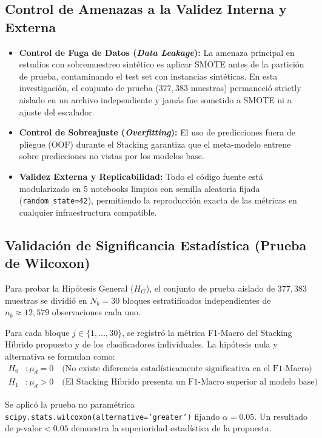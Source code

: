 \subsection{Control de Amenazas a la Validez Interna y Externa}
\begin{itemize}
    \item \textbf{Control de Fuga de Datos (\textit{Data Leakage}):} La amenaza principal en estudios con sobremuestreo sintético es aplicar SMOTE antes de la partición de prueba, contaminando el test set con instancias sintéticas. En esta investigación, el conjunto de prueba ($377,383$ muestras) permaneció strictly aislado en un archivo independiente y jamás fue sometido a SMOTE ni a ajuste del escalador.
    \item \textbf{Control de Sobreajuste (\textit{Overfitting}):} El uso de predicciones fuera de pliegue (OOF) durante el Stacking garantiza que el meta-modelo entrene sobre predicciones no vistas por los modelos base.
    \item \textbf{Validez Externa y Replicabilidad:} Todo el código fuente está modularizado en 5 notebooks limpios con semilla aleatoria fijada (\texttt{random\_state=42}), permitiendo la reproducción exacta de las métricas en cualquier infraestructura compatible.
\end{itemize}

\subsection{Validación de Significancia Estadística (Prueba de Wilcoxon)}
Para probar la Hipótesis General ($H_G$), el conjunto de prueba aislado de $377,383$ muestras se dividió en $N_b = 30$ bloques estratificados independientes de $n_b \approx 12,579$ observaciones cada uno. 

Para cada bloque $j \in \{1, \dots, 30\}$, se registró la métrica F1-Macro del Stacking Híbrido propuesto y de los clasificadores individuales. La hipótesis nula y alternativa se formulan como:
\begin{align}
H_0 &: \mu_d = 0 \quad \text{(No existe diferencia estadísticamente significativa en el F1-Macro)} \\
H_1 &: \mu_d > 0 \quad \text{(El Stacking Híbrido presenta un F1-Macro superior al modelo base)}
\end{align}

Se aplicó la prueba no paramétrica \texttt{scipy.stats.wilcoxon(alternative='greater')} fijando $\alpha = 0.05$. Un resultado de $p\text{-valor} < 0.05$ demuestra la superioridad estadística de la propuesta.